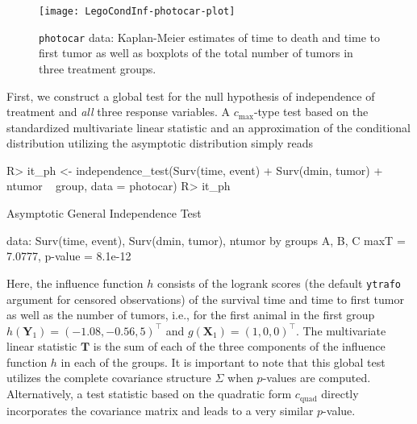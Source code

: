 \documentclass{article}
\newcommand{\Robject}[1]{\texttt{#1}}
\newcommand{\Rcmd}[1]{\texttt{#1}}
\newcommand{\X}{\mathbf{X}}
\newcommand{\Y}{\mathbf{Y}}
\newcommand{\T}{\mathbf{T}}
\newenvironment{Schunk}{}{}
\begin{document}
\begin{figure}
\begin{center}
\texttt{[image: LegoCondInf-photocar-plot]}
\caption{\Robject{photocar} data: 
         Kaplan-Meier estimates of time to death and time to first tumor as
         well as boxplots of the total number of tumors in three treatment
         groups. \label{photocarfig}}
\end{center}
\end{figure}
First, we construct a global test for the null hypothesis of independence
of treatment and \textit{all} three response variables. A
$c_\text{max}$-type test based on the standardized multivariate          
linear statistic and an approximation of the conditional distribution
utilizing the asymptotic distribution simply reads
\begin{Schunk}
\begin{Sinput}
R> it_ph <- independence_test(Surv(time, 
       event) + Surv(dmin, tumor) + ntumor ~ 
       group, data = photocar)
R> it_ph
\end{Sinput}
\begin{Soutput}
	Asymptotic General Independence Test

data:  Surv(time, event), Surv(dmin, tumor), ntumor by groups A, B, C 
maxT = 7.0777, p-value = 8.1e-12
\end{Soutput}
\end{Schunk}
Here, the influence function $h$ consists of the logrank scores 
(the default \Rcmd{ytrafo} argument for censored observations) of the survival
time and time to first tumor as well as the number of tumors, i.e., for the 
first animal in the first group $h(\Y_1) =
( -1.08,-0.56,5 )^\top$
and $g(\X_1) = (1, 0, 0)^\top$. The multivariate linear statistic $\T$ is the sum of each of
the three components of the influence function $h$ in each of the groups.
It is important to note that this global test utilizes the complete
covariance structure $\Sigma$
when $p$-values are computed.
Alternatively, a test statistic based on the quadratic form $c_\text{quad}$
directly incorporates the covariance matrix and leads to a very similar 
$p$-value. 
\end{document}
